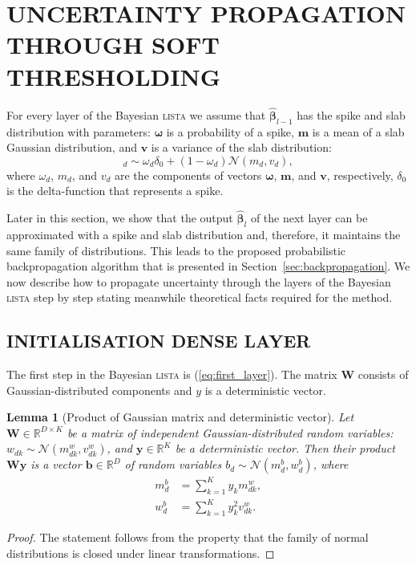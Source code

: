 \documentclass[letterpaper]{article}
\newtheorem{lemma}{Lemma}
\begin{document}
\section{\uppercase{Uncertainty propagation through soft thresholding}}
\label{sec:fprop}
For every layer of the Bayesian \textsc{lista} we assume that $\widehat{\boldsymbol\beta}_{l-1}$ has the spike and slab distribution with parameters: $\boldsymbol\omega$ is a probability of a spike, $\mathbf{m}$ is a mean of a slab Gaussian distribution, and $\mathbf{v}$ is a variance of the slab distribution:
\begin{equation}
[\widehat{\boldsymbol\beta}_{l-1}]_d \sim \omega_d \delta_0 + (1 - \omega_d)\mathcal{N}(m_d, v_d),
\end{equation}
where $\omega_d$, $m_d$, and $v_d$ are the components of vectors $\boldsymbol\omega$, $\mathbf{m}$, and $\mathbf{v}$, respectively, $\delta_0$ is the delta-function that represents a spike.

Later in this section, we show that the output $\widehat{\boldsymbol\beta}_l$ of the next layer can be approximated with a spike and slab distribution and, therefore, it maintains the same family of distributions. This leads to the proposed probabilistic backpropagation algorithm that is presented in Section~\ref{sec:backpropagation}. We now describe how to propagate uncertainty through the layers of the Bayesian \textsc{lista} step by step stating meanwhile theoretical facts required for the method.

\subsection{\uppercase{Initialisation dense layer}}
The first step in the Bayesian \textsc{lista} is (\ref{eq:first_layer}). The matrix $\mathbf{W}$ consists of Gaussian-distributed components and $y$ is a deterministic vector.

 \begin{lemma}[Product of Gaussian matrix and deterministic vector]
 \label{thm:matrix_const}
Let $\mathbf{W} \in \mathbb{R}^{D \times K}$ be a matrix of independent Gaussian-distributed random variables: $w_{dk} \sim \mathcal{N}(m^w_{dk}, v^w_{dk})$, and $\mathbf{y} \in \mathbb{R}^K$ be a deterministic vector. Then their product $\mathbf{W} \mathbf{y}$ is a vector $\mathbf{b} \in \mathbb{R}^{D}$ of random variables $b_d \sim \mathcal{N}(m^b_d, w^b_d)$, where
\begin{subequations}
\begin{align}
m^b_d &= \sum_{k=1}^Ky_k m^w_{dk}, \\
w^b_d &= \sum_{k=1}^Ky_k^2v^w_{dk}.
 \end{align}
\end{subequations}

 \end{lemma}
 \begin{proof}
 	The statement follows from the property that the family of normal distributions is closed under linear transformations.
 \end{proof}
\end{document}
